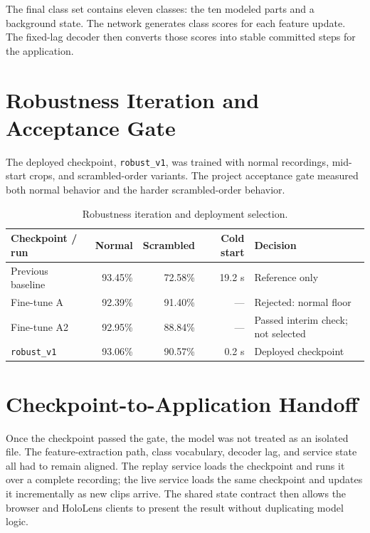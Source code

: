 The final class set contains eleven classes: the ten modeled parts and a
background state. The network generates class scores for each feature update.
The fixed-lag decoder then converts those scores into stable committed steps for
the application.

\section{Robustness Iteration and Acceptance Gate}

The deployed checkpoint, \texttt{robust\_v1}, was trained with normal recordings,
mid-start crops, and scrambled-order variants. The project acceptance gate
measured both normal behavior and the harder scrambled-order behavior.

\begin{table}[H]
\centering
\small
\begin{tabularx}{\textwidth}{@{}p{}rrrX@{}}
\toprule
\textbf{Checkpoint / run} & \textbf{Normal} & \textbf{Scrambled} &
\textbf{Cold start} & \textbf{Decision} \\
\midrule
Previous baseline & 93.45\% & 72.58\% & 19.2 s & Reference only \\
Fine-tune A & 92.39\% & 91.40\% & --- & Rejected: normal floor \\
Fine-tune A2 & 92.95\% & 88.84\% & --- & Passed interim check; not selected \\
\texttt{robust\_v1} & 93.06\% & 90.57\% & 0.2 s & Deployed checkpoint \\
\bottomrule
\end{tabularx}
\caption{Robustness iteration and deployment selection.}
\label{tab:robustness-gate}
\end{table}

\section{Checkpoint-to-Application Handoff}

Once the checkpoint passed the gate, the model was not treated as an isolated
file. The feature-extraction path, class vocabulary, decoder lag, and service
state all had to remain aligned. The replay service loads the checkpoint and
runs it over a complete recording; the live service loads the same checkpoint
and updates it incrementally as new clips arrive. The shared state contract
then allows the browser and HoloLens clients to present the result without
duplicating model logic.

